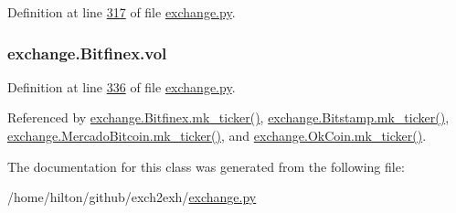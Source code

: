 Definition at line \hyperlink{exchange_8py_source_l00317}{317} of file \hyperlink{exchange_8py_source}{exchange.\+py}.

\subsubsection[{\texorpdfstring{vol}{vol}}]{\setlength{\rightskip}{0pt plus 5cm}exchange.\+Bitfinex.\+vol}\hypertarget{classexchange_1_1_bitfinex_a278da3a9eab93e256041c988f9bbd54c}{}\label{classexchange_1_1_bitfinex_a278da3a9eab93e256041c988f9bbd54c}


Definition at line \hyperlink{exchange_8py_source_l00336}{336} of file \hyperlink{exchange_8py_source}{exchange.\+py}.



Referenced by \hyperlink{exchange_8py_source_l00354}{exchange.\+Bitfinex.\+mk\+\_\+ticker()}, \hyperlink{exchange_8py_source_l00423}{exchange.\+Bitstamp.\+mk\+\_\+ticker()}, \hyperlink{exchange_8py_source_l00557}{exchange.\+Mercado\+Bitcoin.\+mk\+\_\+ticker()}, and \hyperlink{exchange_8py_source_l00622}{exchange.\+Ok\+Coin.\+mk\+\_\+ticker()}.



The documentation for this class was generated from the following file\+:\begin{DoxyCompactItemize}
\item 
/home/hilton/github/exch2exh/\hyperlink{exchange_8py}{exchange.\+py}\end{DoxyCompactItemize}
